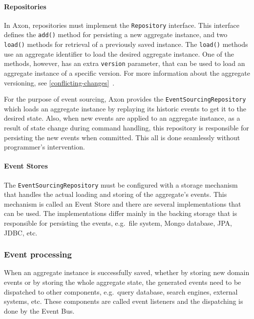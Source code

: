 \documentclass{book}
\begin{document}
\paragraph{Repositories}\label{repositories}

In Axon, repositories must implement the \texttt{Repository} interface.
This interface defines the \texttt{add()} method for persisting a new
aggregate instance, and two \texttt{load()} methods for retrieval of a
previously saved instance. The \texttt{load()} methods use an aggregate
identifier to load the desired aggregate instance. One of the methods,
however, has an extra \texttt{version} parameter, that can be used to
load an aggregate instance of a specific version. For more information
about the aggregate versioning, see \ref{conflicting-changes}~.

For the purpose of event sourcing, Axon provides the
\texttt{EventSourcingRepository} which loads an aggregate instance by
replaying its historic events to get it to the desired state. Also, when
new events are applied to an aggregate instance, as a result of state
change during command handling, this repository is responsible for
persisting the new events when committed. This all is done seamlessly
without programmer's intervention.

\paragraph{Event Stores}\label{event-stores}

The \texttt{EventSourcingRepository} must be configured with a storage
mechanism that handles the actual loading and storing of the aggregate's
events. This mechanism is called an Event Store and there are several
implementations that can be used. The implementations differ mainly in
the backing storage that is responsible for persisting the events,
e.g.~file system, Mongo database, JPA, JDBC, etc.


\subsubsection{Event processing}\label{event-processing}

When an aggregate instance is successfully saved, whether by storing new
domain events or by storing the whole aggregate state, the generated
events need to be dispatched to other components, e.g.~query database,
search engines, external systems, etc. These components are called event
listeners and the dispatching is done by the Event Bus.
\end{document}
